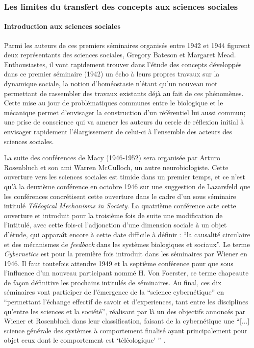 \subsubsection{ Les limites du transfert des concepts aux sciences sociales}

\paragraph{Introduction aux sciences sociales}
Parmi les auteurs de ces premiers séminaires organisés entre 1942 et 1944 figurent deux représentants des sciences sociales, Gregory Bateson et Margaret Mead. Enthousiastes, il vont rapidement trouver dans l'étude des concepts développés dans ce premier séminaire (1942) un écho à leurs propres travaux sur la dynamique sociale, la notion d'homéostasie n'étant qu'un nouveau mot permettant de rassembler des travaux existants déjà au fait de ces phénomènes. Cette mise au jour de problématiques communes entre le biologique et le mécanique permet d'envisager la construction d'un référentiel lui aussi commun; une prise de conscience qui va amener les auteurs du cercle de réflexion initial à envisager rapidement l'élargissement de celui-ci à l'ensemble des acteurs des sciences sociales.

La suite des conférences de Macy (1946-1952) sera organisée par Arturo Rosenbluch et son ami Warren McCulloch, un autre neurobiologiste. Cette ouverture vers les sciences sociales est timide dans un premier temps, et ce n'est qu'à la deuxième conférence en octobre 1946 sur une suggestion de Lazarsfeld que les conférences concrétisent cette ouverture dans le cadre d'un sous séminaire intitulé \textit{Téléogical Mechanisms in Society}. La quatrième conférence acte cette ouverture et introduit pour la troisième fois de suite une modification de l'intitulé, avec cette fois-ci l'adjonction d'une dimension sociale à un objet d'étude, qui apparaît encore à cette date difficile à définir : \enquote{la causalité circulaire et des mécanismes de \textit{feedback} dans les systèmes biologiques et sociaux}. Le terme \textit{Cybernetics} est pour la première fois introduit dans les séminaires par Wiener en 1946. Il faut toutefois attendre 1949 et la septième conférence pour que sous l'influence d'un nouveau participant nommé H. Von Foerster, ce terme chapeaute de façon définitive les prochains intitulés de séminaires. Au final, ces dix séminaires vont participer de l'émergence de la \enquote{science cybernétique} en \enquote{permettant l'échange effectif de savoir et d'experiences, tant entre les disciplines qu'entre les sciences et la société}, réalisant par là un des objectifs annoncés par Wiener et Rosenbluch dans leur classification, faisant de la cybernétique une \enquote{[...] science générale des systèmes à comportement finalisé ayant principalement pour objet ceux dont le comportement est \enquote{téléologique} } \autocite{Pouvreau2013}.

